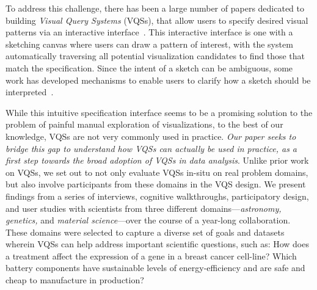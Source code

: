 \par To address this challenge,
there has been a large number of papers
dedicated to building {\em Visual Query Systems} (VQSs),
that allow users to specify
desired visual patterns
via an interactive interface~\cite{mohebbi2011google,Hochheiser2004,wattenberg2001sketching,Siddiqui2017VLDB,ryall2005querylines,correll2016semantics,Mannino2018,Eichmann2015,Holz2009}.
This interactive interface is one with
a sketching canvas
where users can draw a pattern of interest,
with the system automatically traversing
all potential visualization candidates
to find those that match the specification.
Since the intent of a sketch can be ambiguous,
some work has developed mechanisms to
enable users to clarify
how a sketch should be interpreted~\cite{ryall2005querylines,correll2016semantics,Mannino2018,Eichmann2015,Holz2009}.

\par
While this intuitive
specification interface
seems to be a promising solution
to the problem of painful manual exploration of visualizations,
to the best of our knowledge, VQSs are not very commonly used in practice.
{\em Our paper seeks to bridge this gap
to understand how VQSs can actually be used in practice,
as a first step towards the broad adoption of VQSs in data analysis}.
Unlike prior work on VQSs,
we set out to not only evaluate VQSs in-situ on
real problem domains, but also involve participants
from these domains in the VQS design.
We present findings from a series of interviews,
cognitive walkthroughs, participatory design,
and user studies with scientists from three different domains---{\em astronomy, genetics,} and {\em material science}---over the course of
a year-long collaboration.
These domains were selected to capture
a diverse set of goals
and datasets wherein VQSs can help address
important scientific questions, such as:
How does a treatment affect the expression
of a gene in a breast cancer cell-line?
Which battery components have sustainable
levels of energy-efficiency and are safe and
cheap to manufacture in production?

